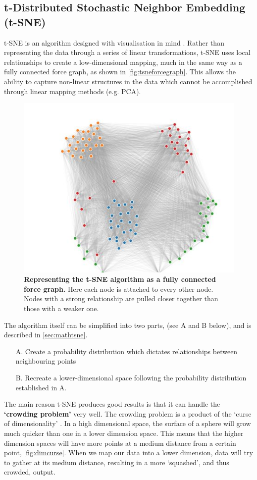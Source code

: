 \subsection{t-Distributed Stochastic Neighbor Embedding (t-SNE)}\label{sec:overcrowd}

t-SNE is an algorithm designed with visualisation in mind \citep{tsne}. Rather than representing the data through a series of linear transformations, t-SNE uses local relationships to create a low-dimensional mapping, much in the same way as a fully connected force graph, as shown in \autoref{fig:tsneforcegraph}. This allows the ability to capture non-linear structures in the data which cannot be accomplished through linear mapping methods (e.g. PCA).

\begin{figure}[H]
    \centering
    \includegraphics[width=.6\textwidth]{./4fig/tsneforcegraph.png}
    \caption{\textbf{Representing the t-SNE algorithm as a fully connected force graph.} Here each node is attached to every other node. Nodes with a strong relationship are pulled closer together than those with a weaker one.}
    \label{fig:tsneforcegraph}
\end{figure}



The algorithm itself can be simplified into two parts, (see A and B below), and is described in \autoref{sec:mathtsne}.

\begin{itemize}
  \item [A.] Create a probability distribution which dictates relationships between neighbouring points
  \item [B.] Recreate a lower-dimensional space following the probability distribution established in A.
\end{itemize}

The main reason t-SNE produces good results is that it can handle the \textbf{`crowding problem'} very well. The crowding problem is a product of the `curse of dimensionality' \citep{curse}. In a high dimensional space, the surface of a sphere will grow much quicker than one in a lower dimension space. This means that the higher dimension spaces will have more points at a medium distance from a certain point, \autoref{fig:dimcurse}. When we map our data into a lower dimension, data will try to gather at its medium distance, resulting in a more `squashed', and thus crowded, output.



